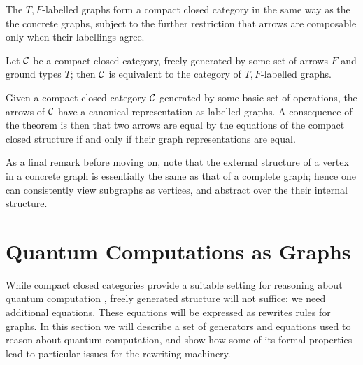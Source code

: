 \documentclass[runningheads]{llncs}
\newcommand{\catC}{\ensuremath{{\cal C}}\xspace}
\begin{document}
The $T,F$-labelled graphs form a compact closed category in the same
way as the the concrete graphs, subject to the further restriction
that arrows are composable only when their labellings agree.  

\begin{theorem}
  Let \catC be a compact closed category, freely generated by some set
  of arrows $F$ and ground types $T$;  then \catC is equivalent to the
  category  of $T,F$-labelled graphs.
\end{theorem}

Given a compact closed  category  \catC generated by some basic set of
operations,  the arrows of \catC have a canonical representation as
labelled graphs.  A consequence of the theorem is then that two arrows
are equal by the equations of the compact closed  structure if and
only if their graph representations are equal.

As a final remark before moving on, note that the external structure
of a vertex in a concrete graph is essentially the same as that of a
complete graph; hence one can consistently view subgraphs as vertices,
and abstract over the their internal structure.

\section{Quantum Computations as Graphs}
\label{sec:quotients-rewriting}

While compact closed categories provide a suitable setting for
reasoning about quantum computation \cite{AbrCoe:CatSemQuant:2004},
freely generated structure will not suffice:  we need additional
equations.  These equations will be expressed as rewrites rules for
graphs.  In this section we will describe a set of generators and equations
used to reason about quantum computation, and show how some of its formal
properties lead to particular issues for the rewriting machinery.
\end{document}
